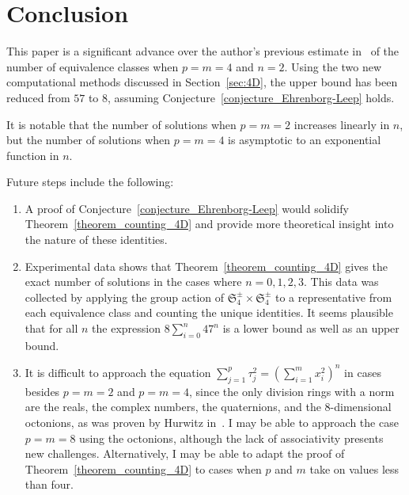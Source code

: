 \documentclass[12pt,table]{article}
\theoremstyle{definition}
\theoremstyle{remark}
\numberwithin{equation}{section}
\begin{document}
\section{Conclusion}



This paper is a significant advance
over the author's previous
estimate 
in~\cite{Ehrenborg_2018}
of the number of equivalence classes
when
$p = m = 4$ and $n=2$. Using the two
new computational methods discussed
in Section~\ref{sec:4D}, the upper bound
has been reduced from $57$ to $8$,
assuming Conjecture~\ref{conjecture_Ehrenborg-Leep}
holds.

It is notable that the number of solutions
when $p = m = 2$ increases linearly in
$n$, but the number of solutions
when $p = m = 4$
is asymptotic to an
exponential
function
in $n$.

Future steps include the following:
\begin{enumerate}
\item A proof of
Conjecture~\ref{conjecture_Ehrenborg-Leep}
would solidify Theorem~\ref{theorem_counting_4D}
and provide more theoretical insight
into the nature of these identities.
\item Experimental data shows that 
Theorem~\ref{theorem_counting_4D}
gives the exact number of solutions
in the cases where $n = 0, 1, 2, 3$.
This data was collected by applying the
group action of
$ \mathfrak{S}_4^\pm \times \mathfrak{S}_4^\pm $
to a representative from each equivalence
class and counting the unique identities.
It seems plausible that for all $n$
the expression  $ 8 \sum_{i = 0}^n{47^n} $ is
a lower bound as well as an upper bound.
\item It is difficult to approach the equation
$ \sum_{j = 1}^{p} \tau_j ^ 2 = \left( \sum_{i = 1}^{m} x_i ^ 2 \right) ^ n $
in cases besides $p = m = 2$ and $p = m = 4$, since
the only division rings with a norm are the reals, the complex
numbers, the quaternions, and the $8$-dimensional
octonions, as was proven by Hurwitz in~\cite{Hurwitz}.
I may be able to approach the case $p = m = 8$
using the octonions,
although the lack of associativity presents
new challenges.
Alternatively, I may be able to adapt
the proof of Theorem~\ref{theorem_counting_4D} to
cases when $p$ and $m$ take on values
less than four.
\end{enumerate}


\newcommand{\journal}[6]{{\sc #1,} #2, {\it #3} {\bf #4} (#5), #6.}
\newcommand{\preprint}[3]{{\sc #1,} #2, preprint #3.}
\newcommand{\book}[4]{{\sc #1,} #2, #3, #4.}
\newcommand{\collection}[6]{{\sc #1,}  #2, #3, in {\it #4}, #5, #6.}
\newcommand{\JCTA}{J.\ Combin.\ Theory Ser.\ A}
\newcommand{\arxiv}[3]{{\sc #1,} #2, {\tt #3}.}
\newcommand{\article}[3]{{\sc #1,} #2, {\tt #3}.}
\newcommand{\journalfive}[5]{{\sc #1,} #2, {\it #3}  (#4), #5.}
\end{document}
